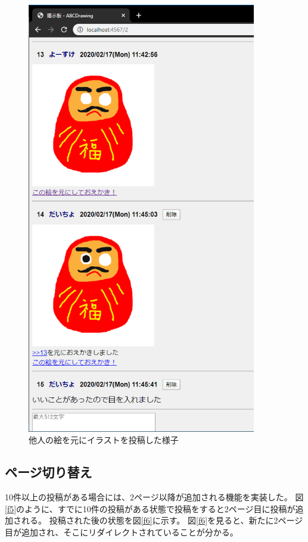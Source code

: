 \documentclass[a4j,titlepage]{jsarticle}
\begin{document}
\begin{figure}[H]
  \centering
  \includegraphics[width=10cm]{originpost.png}
  \caption{他人の絵を元にイラストを投稿した様子}
  \label{originpost}
\end{figure}

\subsection{ページ切り替え}
10件以上の投稿がある場合には、2ページ以降が追加される機能を実装した。
図\ref{f5}のように、すでに10件の投稿がある状態で投稿をすると2ページ目に投稿が追加される。
投稿された後の状態を図\ref{f6}に示す。
図\ref{f6}を見ると、新たに2ページ目が追加され、そこにリダイレクトされていることが分かる。
\end{document}
